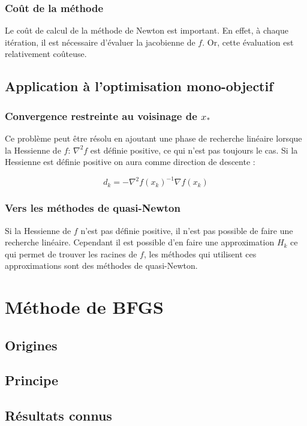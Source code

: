 \documentclass[3p, twocolumn]{elsarticle}
\begin{document}
\subsubsection{Coût de la méthode}
Le coût de calcul de la méthode de Newton est important. En effet, à chaque itération, il est nécessaire d’évaluer la jacobienne de $f$. Or, cette évaluation est relativement coûteuse.

\subsection{Application à l'optimisation mono-objectif} 

\subsubsection{Convergence restreinte au voisinage de $x_*$}
Ce problème peut être résolu en ajoutant une phase de recherche linéaire lorsque la Hessienne de $f$: $\nabla ^{2}f$ est définie positive, ce qui n'est pas toujours le cas. Si la Hessienne est définie positive on aura comme direction de descente :

\begin{equation*}
    d_{k} = -\nabla ^{2}f(x_{k})^{-1} \nabla f(x_{k})
\end{equation*}
\subsubsection{Vers les méthodes de quasi-Newton}
Si la Hessienne de $f$ n'est pas définie positive, il n'est pas possible de faire une recherche linéaire. Cependant il est possible d'en faire une approximation $H_{k}$ ce qui permet de trouver les racines de $f$, les méthodes qui utilisent ces approximations sont des méthodes de quasi-Newton.

\section{Méthode de BFGS}
\subsection{Origines}
\subsection{Principe}
\subsection{Résultats connus}
\end{document}
